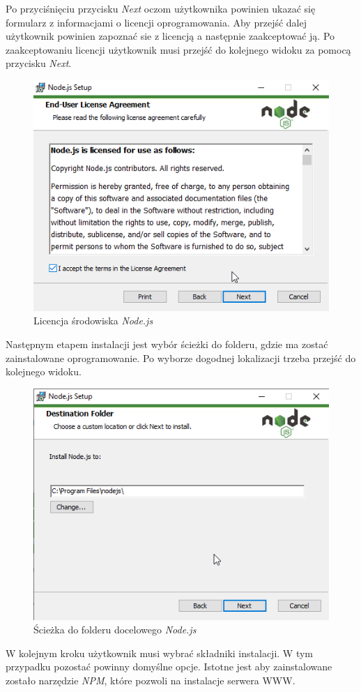 \documentclass[a4paper,twoside,12pt]{book}
\begin{document}
Po przyciśnięciu przycisku \textit{Next} oczom użytkownika powinien ukazać się formularz z informacjami o licencji oprogramowania. Aby przejść dalej użytkownik powinien zapoznać sie z licencją a następnie zaakceptować ją. Po zaakceptowaniu licencji użytkownik musi przejść do kolejnego widoku za pomocą przycisku \textit{Next}.
\begin{figure}[H]
	\centering
	\includegraphics[width=0.7\linewidth]{../zrzuty_ekranu/instalacja_nodejs/node2}
	\caption{Licencja środowiska \textit{Node.js}}
	\label{fig:node2}
\end{figure}

Następnym etapem instalacji jest wybór ścieżki do folderu, gdzie ma zostać zainstalowane oprogramowanie. Po wyborze dogodnej lokalizacji trzeba przejść do kolejnego widoku.
\begin{figure}[H]
	\centering
	\includegraphics[width=0.7\linewidth]{../zrzuty_ekranu/instalacja_nodejs/node3}
	\caption{Ścieżka do folderu docelowego \textit{Node.js}}
	\label{fig:node3}
\end{figure}

W kolejnym kroku użytkownik musi wybrać składniki instalacji. W tym przypadku pozostać powinny domyślne opcje. Istotne jest aby zainstalowane zostało narzędzie \textit{NPM}, które pozwoli na instalacje serwera WWW.
\end{document}
